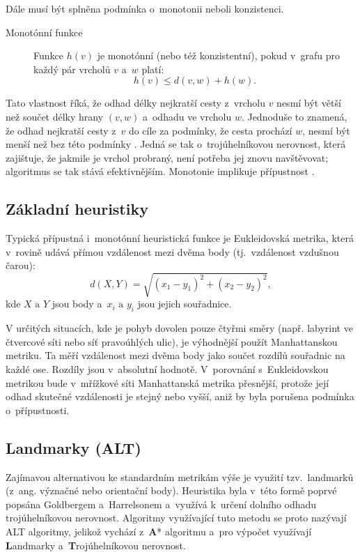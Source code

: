 Dále musí být splněna podmínka o~monotonii neboli konzistenci.

\begin{description}
	\item[Monotónní funkce] Funkce $h(v)$ je monotónní (nebo též konzistentní), pokud v~grafu pro každý pár vrcholů $v$ a~$w$ platí:
	$$
	h(v) \leq d(v,w) + h(w).
	$$
\end{description}

Tato vlastnost říká, že odhad délky nejkratší cesty z~vrcholu $v$ nesmí být větší než součet délky hrany $(v,w)$ a~odhadu ve vrcholu $w$. Jednoduše to znamená, že odhad nejkratší cesty z~$v$ do cíle za podmínky, že cesta prochází $w$, nesmí být menší než bez této podmínky \cite{PearlHeuristics}. Jedná se tak o~trojúhelníkovou nerovnost, která zajištuje, že jakmile je vrchol probraný, není potřeba jej znovu navštěvovat; algoritmus se tak stává efektivnějším. Monotonie implikuje přípustnost \cite{PearlHeuristics}. 

\subsection{Základní heuristiky}
Typická přípustná i~monotónní heuristická funkce je Eukleidovská metrika, která v~rovině udává přímou vzdálenost mezi dvěma body (tj.~vzdálenost vzdušnou čarou):
$$
d(X, Y) = \sqrt{(x_1 - y_1)^2 + (x_2 - y_2)^2},
$$
kde \(X\text{ a~} Y\) jsou body a~\(x_i \text{ a~} y_i\) jsou jejich souřadnice.

V určitých situacích, kde je pohyb dovolen pouze čtyřmi směry (např. labyrint ve čtvercové síti nebo síť pravoúhlých ulic), je výhodnější použít Manhattanskou metriku. Ta měří vzdálenost mezi dvěma body jako součet rozdílů souřadnic na každé ose. Rozdíly jsou v~absolutní hodnotě. V~porovnání s~Eukleidovskou metrikou bude v~mřížkové síti Manhattanská metrika přesnější, protože její odhad skutečné vzdálenosti je stejný nebo vyšší, aniž by byla porušena podmínka o~přípustnosti. 

\subsection{Landmarky (ALT)}
\label{staticLANDMARKS}

Zajímavou alternativou ke standardním metrikám výše je využití tzv.~landmarků (z~ang. význačné nebo orientační body). Heuristika byla v~této formě poprvé popsána Goldbergem a~Harrelsonem \cite{goldberg03AMeetsGT} a~využívá k~určení dolního odhadu trojúhelníkovou nerovnost. Algoritmy využívající tuto metodu se proto nazývají ALT algoritmy, jelikož vychází z~\textbf{A}* algoritmu a~pro výpočet využívají \textbf{L}andmarky a~\textbf{T}rojúhelníkovou nerovnost.

